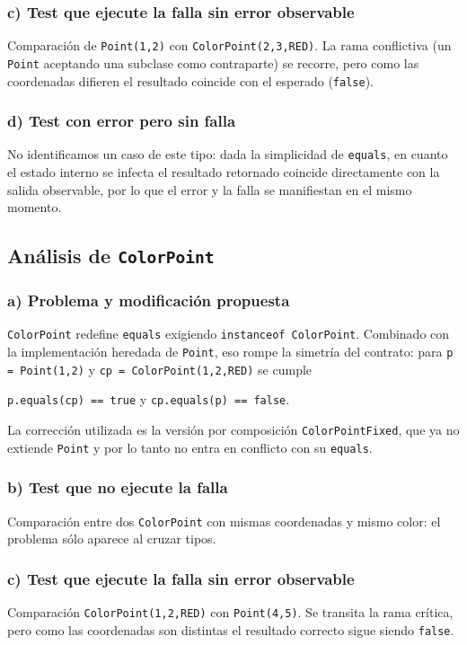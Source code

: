 \documentclass[12pt,a4paper]{article}
\begin{document}
\subsubsection*{c) Test que ejecute la falla sin error observable}
Comparación de \texttt{Point(1,2)} con \texttt{ColorPoint(2,3,RED)}. La rama conflictiva (un \texttt{Point} aceptando una subclase como contraparte) se recorre, pero como las coordenadas difieren el resultado coincide con el esperado (\texttt{false}).

\subsubsection*{d) Test con error pero sin falla}
No identificamos un caso de este tipo: dada la simplicidad de \texttt{equals}, en cuanto el estado interno se infecta el resultado retornado coincide directamente con la salida observable, por lo que el error y la falla se manifiestan en el mismo momento.

\subsection{Análisis de \texttt{ColorPoint}}
\subsubsection*{a) Problema y modificación propuesta}
\texttt{ColorPoint} redefine \texttt{equals} exigiendo \texttt{instanceof ColorPoint}. Combinado con la implementación heredada de \texttt{Point}, eso rompe la simetría del contrato: para \texttt{p = Point(1,2)} y \texttt{cp = ColorPoint(1,2,RED)} se cumple
\begin{center}
\texttt{p.equals(cp) == true} \hspace{0.5cm}y\hspace{0.5cm} \texttt{cp.equals(p) == false}.
\end{center}
La corrección utilizada es la versión por composición \texttt{ColorPointFixed}, que ya no extiende \texttt{Point} y por lo tanto no entra en conflicto con su \texttt{equals}.

\subsubsection*{b) Test que no ejecute la falla}
Comparación entre dos \texttt{ColorPoint} con mismas coordenadas y mismo color: el problema sólo aparece al cruzar tipos.

\subsubsection*{c) Test que ejecute la falla sin error observable}
Comparación \texttt{ColorPoint(1,2,RED)} con \texttt{Point(4,5)}. Se transita la rama crítica, pero como las coordenadas son distintas el resultado correcto sigue siendo \texttt{false}.
\end{document}
